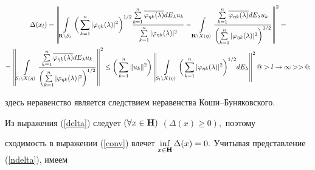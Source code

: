 \begin{multline}


\label{conv} 


\Delta ( x_l) = 


\left\|  \int\limits_{{\bold R}\setminus S_l }\bigg( \sum_{k=1}^n|


\varphi_{\eta k}( \lambda ) |^2\bigg)^{1/2} \frac{


\sum\limits_{k=1}^n\overline{\varphi_{\eta k}( \lambda ) }


dE_\lambda u_k}{\sum\limits_{k=1}^n| \varphi_{\eta k}( \lambda


) |^2} -\int\limits_{{\bold R}\setminus X( \eta ) }


\frac{ \sum\limits_{k=1}^n\overline{\varphi_{\eta k}( \lambda ) }


dE_\lambda u_k }{\left( \sum\limits_{k=1}^n| \varphi_{\eta k}(


\lambda ) |^2\right)^{1/2}}\right\|^2= \\


%


=\left\| \int\limits_{S_l \setminus X ( \eta ) } \frac{


\sum\limits_{k=1}^n\overline{\varphi_{\eta k}( \lambda ) }


dE_\lambda u_k}{\left(\sum\limits_{k=1}^n| \varphi_{\eta k}(


\lambda ) |^2\right)^{1/2}}\right\|^2 \leq 


\bigg(\sum_{k=1}^n\| u_k\|^2\bigg) \left\|


\int\limits_{S_l \setminus X ( \eta ) }\bigg( 


\sum_{k=1}^n| \varphi_{\eta k}( \lambda ) |^2\bigg) 


^{1/2}dE_\lambda \right\|^2


@>{l\to\infty}>> 0; 


\end{multline}


здесь неравенство является следствием неравенства Коши--Буняковского.





Из выражения (\ref{delta}) следует $( \forall x\in {\bold 


H} )$ $(\Delta ( x) \geq 0),$ поэтому 


сходимость в выражении (\ref{conv}) влечет $\inf\limits_{x\in {\bold H}}\Delta


(x)=0.$ Учитывая представление (\ref{ndelta}), имеем 


$$


